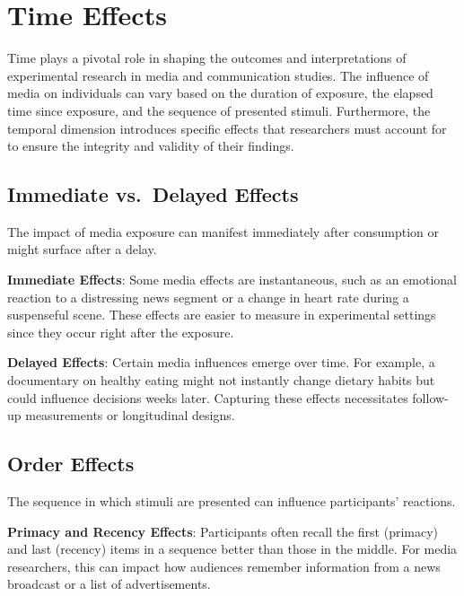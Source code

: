 \documentclass[
  b5paper]{book}
\begin{document}
\hypertarget{time-effects}{%
\section{Time Effects}\label{time-effects}}

Time plays a pivotal role in shaping the outcomes and interpretations of experimental research in media and communication studies. The influence of media on individuals can vary based on the duration of exposure, the elapsed time since exposure, and the sequence of presented stimuli. Furthermore, the temporal dimension introduces specific effects that researchers must account for to ensure the integrity and validity of their findings.

\hypertarget{immediate-vs.-delayed-effects}{%
\subsection*{Immediate vs.~Delayed Effects}\label{immediate-vs.-delayed-effects}}

The impact of media exposure can manifest immediately after consumption or might surface after a delay.

\textbf{Immediate Effects}: Some media effects are instantaneous, such as an emotional reaction to a distressing news segment or a change in heart rate during a suspenseful scene. These effects are easier to measure in experimental settings since they occur right after the exposure.

\textbf{Delayed Effects}: Certain media influences emerge over time. For example, a documentary on healthy eating might not instantly change dietary habits but could influence decisions weeks later. Capturing these effects necessitates follow-up measurements or longitudinal designs.

\hypertarget{order-effects}{%
\subsection*{Order Effects}\label{order-effects}}

The sequence in which stimuli are presented can influence participants' reactions.

\textbf{Primacy and Recency Effects}: Participants often recall the first (primacy) and last (recency) items in a sequence better than those in the middle. For media researchers, this can impact how audiences remember information from a news broadcast or a list of advertisements.
\end{document}

